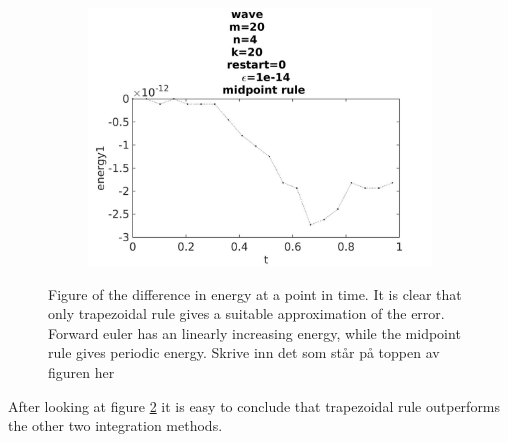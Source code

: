 \begin{figure}[H]
\begin{subfigure}[b]{0.30\textwidth}
                \includegraphics[width=\textwidth]{../MATLAB/fig/energyovertimemidpoint.jpg}
                \caption{  }
                \label{fig:errormid}
        \end{subfigure}
        \caption{Figure of the difference in energy at a point in time. It is clear that only trapezoidal rule gives a suitable approximation of the error. Forward euler has an linearly increasing energy, while the midpoint rule gives periodic energy.  Skrive inn det som står på toppen av figuren her}
        \label{fig:energy}
\end{figure}
After looking at figure \ref{fig:energy} it is easy to conclude that trapezoidal rule outperforms the other two integration methods.